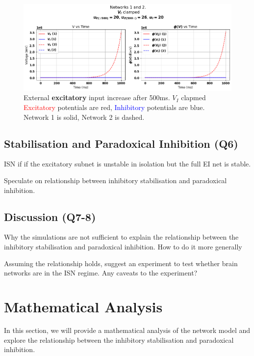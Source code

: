 \documentclass[10pt,twocolumn]{article}
\begin{document}
\begin{figure}
    \centering
    \captionsetup{justification=centering}
    \includegraphics[width=1\textwidth]{images/12-E_input_V_I_clamped.png}
    \caption{External \textbf{excitatory} input increase after 500ms. $V_I$ clapmed \\
        \textcolor{red}{Excitatory} potentials are red, \textcolor{blue}{Inhibitory} potentials are blue.\\
        Network 1 is solid, Network 2 is dashed.}
    \label{fig:e-input-clamped}
\end{figure}

\subsection{Stabilisation and Paradoxical Inhibition (Q6)}
ISN if if the excitatory subnet is unstable in isolation
but the full EI net is stable.

Speculate on relationship between inhibitory stabilisation
and paradoxical inhibition.

\subsection{Discussion (Q7-8)}
Why the simulations are not sufficient to explain
the relationship between the inhibitory stabilisation
and paradoxical inhibition. How to do it more generally

Assuming the relationship holds, suggest an experiment
to test whether brain networks are in the ISN regime.
Any caveats to the experiment?

\section{Mathematical Analysis}
In this section, we will provide a mathematical analysis
of the network model and explore the relationship between
the inhibitory stabilisation and paradoxical inhibition.
\end{document}
